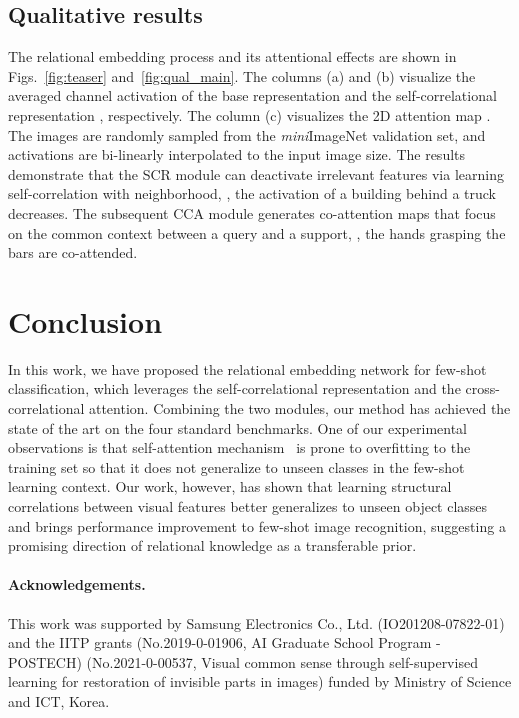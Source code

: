 \documentclass[10pt,twocolumn,letterpaper]{article}
\newcommand{\itmini}{\textit{mini}}
\newcommand{\abbself}{SCR\xspace}
\newcommand{\abbcross}{CCA\xspace}
\begin{document}
\subsection{Qualitative results}
\label{sec:qual}
The relational embedding process and its attentional effects are shown in Figs.~\ref{fig:teaser} and~\ref{fig:qual_main}.
The columns (a) and (b) visualize the averaged channel activation of the base representation  and the self-correlational representation , respectively.
The column (c) visualizes the 2D attention map .
The images are randomly sampled from the \itmini ImageNet validation set, and activations are bi-linearly interpolated to the input image size.
The results demonstrate that the \abbself module can deactivate irrelevant features via learning self-correlation with neighborhood, \eg, the activation of a building behind a truck decreases.
The subsequent \abbcross module generates co-attention maps that focus on the common context between a query and a support, \eg, the hands grasping the bars are co-attended. \section{Conclusion}
In this work, we have proposed the relational embedding network for few-shot classification, which leverages the self-correlational representation and the cross-correlational attention. 
Combining the two modules, our method has achieved the state of the art on the four standard benchmarks.
One of our experimental observations is that self-attention mechanism~\cite{nlsa, lsa} is prone to overfitting to the training set so that it does not generalize to unseen classes in the few-shot learning context.
Our work, however, has shown that learning structural correlations between visual features better generalizes to unseen object classes and brings performance improvement to few-shot image recognition, suggesting a promising direction of relational knowledge as a transferable prior.
 \paragraph{Acknowledgements.}
This work was supported by Samsung Electronics Co., Ltd. (IO201208-07822-01) and the IITP grants (No.2019-0-01906, AI Graduate School Program - POSTECH) (No.2021-0-00537, Visual common sense through self-supervised learning for restoration of invisible parts in images) funded by Ministry of Science and ICT, Korea. 


{\small


}
\end{document}
